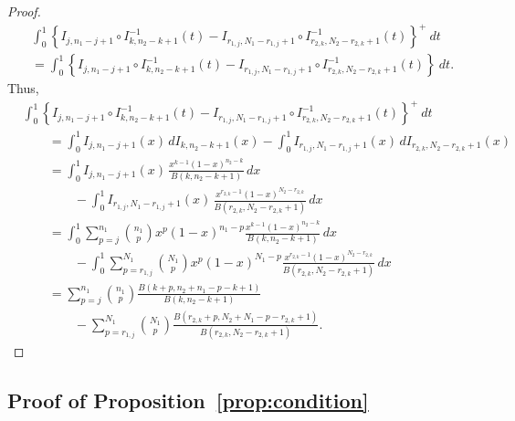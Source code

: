 \documentclass[12pt]{article}
\begin{document}
\begin{proof}
\begin{align*}
	&\int_0^1 \left\{I_{j, n_1-j+1} \circ I_{k, n_2-k+1}^{-1}(t) - I_{ r_{1,j}, N_1- r_{1,j}+1} \circ I_{ r_{2,k}, N_2- r_{2,k}+1}^{-1}(t)\right\}^+\ dt \\
	&= \int_0^1 \left\{I_{j, n_1-j+1} \circ I_{k, n_2-k+1}^{-1}(t) - I_{ r_{1,j}, N_1- r_{1,j}+1} \circ I_{ r_{2,k}, N_2- r_{2,k}+1}^{-1}(t)\right\}\ dt.
\end{align*}
Thus,
\begin{align*}	
&\int_0^1 \left\{I_{j, n_1-j+1} \circ I_{k, n_2-k+1}^{-1}(t) - I_{ r_{1,j}, N_1- r_{1,j}+1} \circ I_{ r_{2,k}, N_2- r_{2,k}+1}^{-1}(t)\right\}^+\ dt \\
	&\qquad= \int_0^1 I_{j, n_1 - j + 1}(x)\, dI_{k, n_2 - k + 1}(x)
- \int_0^1 I_{r_{1,j}, N_1 - r_{1,j} + 1}(x)\, dI_{r_{2,k}, N_2 - r_{2,k} + 1}(x)\\
&\qquad= \int_0^1 I_{j, n_1 - j + 1}(x)\,
\frac{x^{k-1}(1-x)^{n_2-k}}{B(k, n_2-k+1)} \, dx \\
&\qquad\qquad- \int_0^1 I_{r_{1,j}, N_1-r_{1,j}+1}(x)\,
\frac{x^{r_{2,k}-1}(1-x)^{N_2-r_{2,k}}}{B(r_{2,k}, N_2-r_{2,k}+1)} \, dx\\
&\qquad = \int_0^1 \sum_{p=j}^{n_1}\binom{n_1}{p}
x^p(1-x)^{n_1-p}
\frac{x^{k-1}(1-x)^{n_2-k}}{B(k, n_2-k+1)} \, dx \\
&\qquad\qquad - \int_0^1 \sum_{p=r_{1,j}}^{N_1}\binom{N_1}{p}
x^p(1-x)^{N_1-p}
\frac{x^{r_{2,k}-1}(1-x)^{N_2-r_{2,k}}}{B(r_{2,k}, N_2-r_{2,k}+1)} \, dx\\ 
&\qquad = \sum_{p=j}^{n_1}\binom{n_1}{p}
\frac{B(k+p, n_2+n_1-p-k+1)}{B(k, n_2-k+1)} \\
&\qquad\qquad - \sum_{p=r_{1,j}}^{N_1}\binom{N_1}{p}
\frac{B(r_{2,k}+p, N_2+N_1-p-r_{2,k}+1)}{B(r_{2,k}, N_2-r_{2,k}+1)}.
\end{align*}
\end{proof}



\subsection{Proof of Proposition~\ref{prop:condition}}
\end{document}

